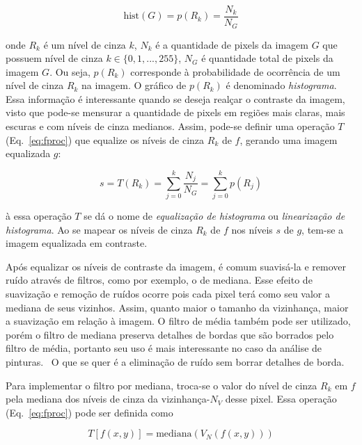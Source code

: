 \begin{equation}
\text{hist}(G) = p(R_k) = \frac{N_k}{N_G}
\end{equation}

\noindent onde $R_k$ é um nível de cinza $k$, $N_k$ é a quantidade de
pixels da imagem $G$ que possuem nível de cinza $k \in \{0, 1, ...,
255\}$, $N_G$ é quantidade total de pixels da imagem $G$. Ou seja,
$p(R_k)$ corresponde à probabilidade de ocorrência de um nível de
cinza $R_k$ na imagem. O gráfico de $p(R_k)$ é denominado
\emph{histograma}. Essa informação é interessante quando se deseja
realçar o contraste da imagem, visto que pode-se mensurar a quantidade
de pixels em regiões mais claras, mais escuras e com níveis de cinza
medianos. Assim, pode-se definir uma operação $T$ (Eq.~\ref{eq:fproc}) que equalize os
níveis de cinza $R_k$ de $f$, gerando uma imagem equalizada $g$:

\begin{equation}
s = T(R_k) = \sum_{j=0}^k \frac{N_j}{N_G} = \sum_{j=0}^k p(R_j)
\end{equation}

\noindent à essa operação $T$ se dá o nome de \emph{equalização de
  histograma} ou \emph{linearização de histograma}. Ao se mapear os
níveis de cinza $R_k$ de $f$ nos níveis $s$ de $g$, tem-se a imagem
equalizada em contraste.


Após equalizar os níveis de contraste da imagem, é comum suavisá-la e
remover ruído através de filtros, como por exemplo, o de mediana. Esse
efeito de suavização e remoção de ruídos ocorre pois cada pixel terá
como seu valor a mediana de seus vizinhos. Assim, quanto maior o
tamanho da vizinhança, maior a suavização em relação à imagem. O
filtro de média também pode ser utilizado, porém o filtro de mediana
preserva detalhes de bordas que são borrados pelo filtro de média,
portanto seu uso é mais interessante no caso da análise de
pinturas.~\cite{gonzalez} O que se quer é a eliminação de ruído sem
borrar detalhes de borda.

Para implementar o filtro por mediana, troca-se o valor do nível de
cinza $R_k$ em $f$ pela mediana dos níveis de cinza da
vizinhança-$N_V$ desse pixel. Essa operação (Eq.~\ref{eq:fproc}) pode
ser definida como

\begin{equation}
  T[f(x,y)] = \text{mediana}(V_N(f(x,y)))
\end{equation}

